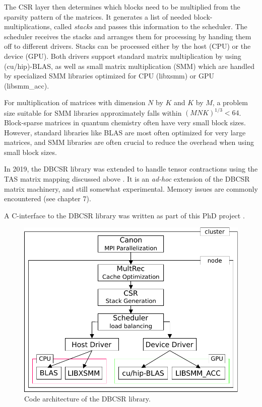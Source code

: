 The CSR layer then determines which blocks need to be multiplied from the sparsity pattern of the matrices. It generates a list of needed block-multiplications, called \emph{stacks} and passes this information to the scheduler. The scheduler receives the stacks and arranges them for processing by handing them off to different drivers. Stacks can be processed either by the host (CPU) or the device (GPU). Both drivers support standard matrix multiplication by using (cu/hip)-BLAS, as well as small matrix multiplication (SMM) which are handled by specialized SMM libraries optimized for CPU (libxsmm) or GPU (libsmm\_acc). 

For multiplication of matrices with dimension $N$ by $K$ and $K$ by $M$, a problem size suitable for SMM libraries approximately falls within $(MNK)^{1/3} < 64$. Block-sparse matrices in quantum chemistry often have very small block sizes. However, standard libraries like BLAS are most often optimized for very large matrices, and SMM libraries are often crucial to reduce the overhead when using small block sizes. 

In 2019, the DBCSR library  was extended to handle tensor contractions using the TAS matrix mapping discussed above \cite{Siv2019}. It is an \emph{ad-hoc} extension of the DBCSR matrix machinery, and still somewhat experimental. Memory issues are commonly encountered (see chapter 7).

A C-interface to the DBCSR library was written as part of this PhD project \cite{Amb2020}.


\begin{figure}
\centering
\includegraphics[scale=0.9]{Pics/DBCSRARCH}
\caption{Code architecture of the DBCSR library.}
\label{fig:ARCH}
\end{figure}



